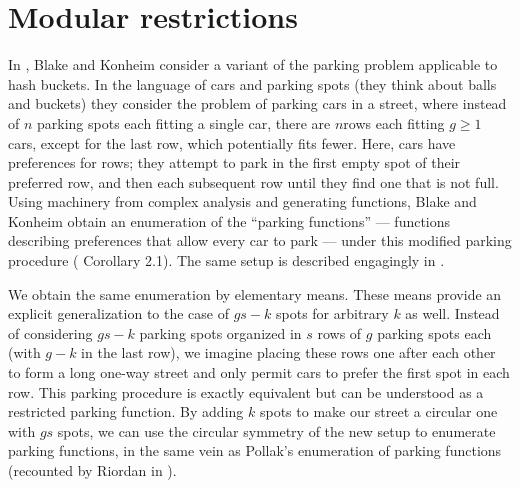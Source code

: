 \documentclass[12pt]{article}
\begin{document}
\section{Modular restrictions \label{modularsection}}

In \cite{blake-konheim-1977}, Blake and Konheim consider a variant of the parking problem applicable to hash buckets. In the language of cars and parking spots (they think about balls and buckets) they consider the problem of parking cars in a street, where instead of $n$ parking spots each fitting a single car, there are $n $rows each fitting $g\ge 1$ cars, except for the last row, which potentially fits fewer. Here, cars have preferences for rows; they attempt to park in the first empty spot of their preferred row, and then each subsequent row until they find one that is not full. Using machinery from complex analysis and generating functions, Blake and Konheim obtain an enumeration of the ``parking functions'' --- functions describing preferences that allow every car to park --- under this modified parking procedure (\cite{blake-konheim-1977} Corollary 2.1). The same setup is described engagingly in \cite{carlson-harris-2020}.

We obtain the same enumeration by elementary means. These means provide an explicit generalization to the case of $gs - k$ spots for arbitrary $k$ as well. Instead of considering $gs - k$ parking spots organized in $s$ rows of $g$ parking spots each (with $g - k$ in the last row), we imagine placing these rows one after each other to form a long one-way street and only permit cars to prefer the first spot in each row. This parking procedure is exactly equivalent but can be understood as a restricted parking function. By adding $k$ spots to make our street a circular one with $gs$ spots, we can use the circular symmetry of the new setup to enumerate parking functions, in the same vein as Pollak's enumeration of parking functions (recounted by Riordan in \cite{riordan-1969}).
\end{document}
